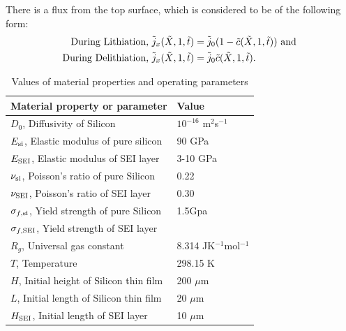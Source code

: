 There is a flux from the top surface, which is considered to be of the following form: 
\begin{align}
    \text{During Lithiation, }\tilde{j}_x(\tilde{X}, 1, \tilde{t}) &= \tilde{j}_0 (1 - \tilde{c}(\tilde{X}, 1, \tilde{t})) \text{ and } \\
    \text{During Delithiation, }\tilde{j}_x(\tilde{X}, 1, \tilde{t}) &= \tilde{j}_0 \tilde{c}(\tilde{X}, 1, \tilde{t}).
\end{align} 

\begin{table}[H]
\caption{Values of material properties and operating parameters}
\vspace{1em}
\begin{tabularx}{\textwidth}{Xl}
\hline
  {Material property or parameter} & {Value} \\
\hline
$D_0$, Diffusivity of Silicon & $10^{-16}$ m$^{2}$s$^{-1}$ \\
$E_{{\rm{si}}}$, Elastic modulus of pure silicon & 90 GPa \\
$E_{\rm{SEI}}$, Elastic modulus of SEI layer & 3-10 GPa \\
$\nu_{{\rm{si}}}$, Poisson's ratio of pure Silicon & 0.22\\
$\nu_{\rm{SEI}}$, Poisson's ratio of SEI layer & 0.30\\
$\sigma_{f,{\rm{si}}}$, Yield strength of pure Silicon & 1.5Gpa\\
$\sigma_{f, {\rm{SEI}}}$, Yield strength of SEI layer & \\
$R_g$, Universal gas constant & 8.314 JK$^{-1}$mol$^{-1}$\\
$T$, Temperature & 298.15 K\\
$H$, Initial height of Silicon thin film & 200 $\mu$m\\
$L$, Initial length of Silicon thin film & 20 $\mu$m\\
$H_{\rm{SEI}}$, Initial length of SEI layer & 10 $\mu$m
\end{tabularx}
\end{table}



